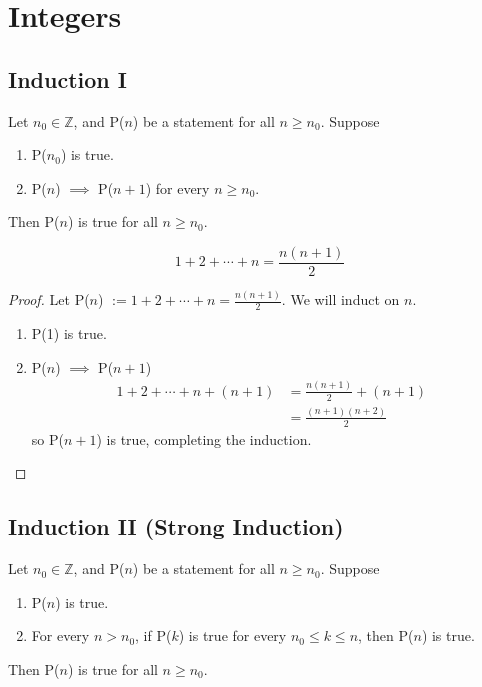\documentclass{report}
\newcommand{\Z}{\mathbb{Z}}
\newcommand{\proposition}[1]{\begin{tcolorbox}[title=\textit{Proposition}]{#1}\end{tcolorbox}}
\begin{document}
\section{Integers}
\subsection{Induction I}
Let $n_0 \in \Z$, and P($n$) be a statement for all $n \geq n_0$. Suppose 
\begin{enumerate}[label=\textit{(\roman*)}]
    \item P($n_0$) is true.
    \item P($n$) $\implies$ P($n + 1$) for every $n \geq n_0$.
\end{enumerate}
Then P($n$) is true for all $n \geq n_0$.

\proposition{
    \[1 + 2 + \cdots + n = \frac{n(n + 1)}{2}\]
}
\begin{proof}
    Let P($n$) $:= 1 + 2 + \cdots + n = \frac{n(n + 1)}{2}$. We will induct on $n$.
    \begin{enumerate}[label=\textit{(\roman*)}]
        \item P(1) is true.
        \item P($n$) $\implies$ P($n + 1$)
            \newline
            \begin{align*}
                1 + 2 + \cdots + n + (n + 1) &= \frac{n(n + 1)}{2} + (n + 1) \\
                                             &= \frac{(n + 1)(n + 2)}{2}
            \end{align*}
            so P($n + 1$) is true, completing the induction.
    \end{enumerate}
\end{proof}

\subsection{Induction II (Strong Induction)}
Let $n_0 \in \Z$, and P($n$) be a statement for all $n \geq n_0$. Suppose 
\begin{enumerate}[label=\textit{(\roman*)}]
    \item P($n$) is true.
    \item For every $n > n_0$, if P($k$) is true for every $n_0 \leq k \leq n$, then P($n$) is true.
\end{enumerate}
Then P($n$) is true for all $n \geq n_0$.
\end{document}
